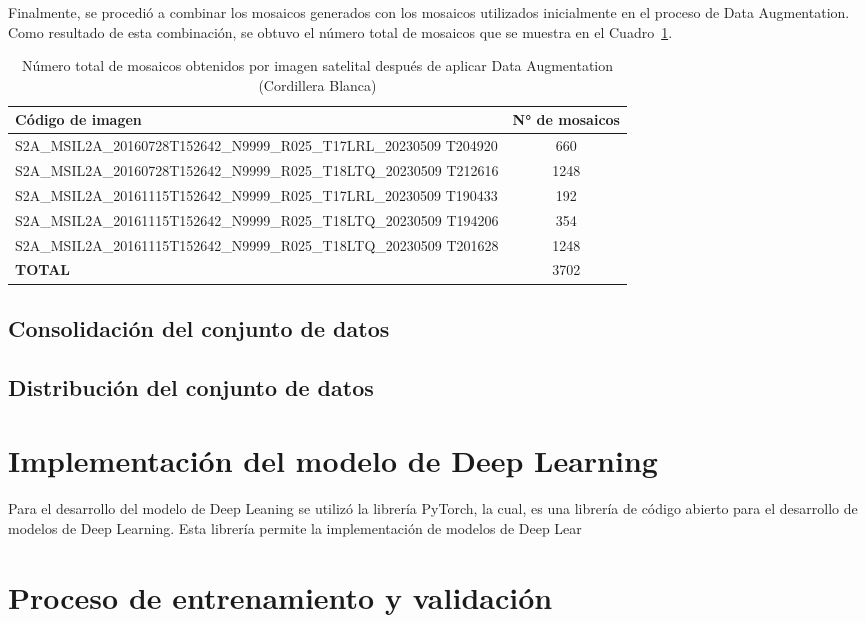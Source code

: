 \documentclass[12pt]{report}
\begin{document}
Finalmente, se procedió a combinar los mosaicos generados con los mosaicos utilizados inicialmente en el proceso de Data Augmentation. Como resultado de esta combinación, se obtuvo el número total de mosaicos que se muestra en el Cuadro~\ref{tab:MosaicosConAumentoDatosFinal}.

\begin{table}[H]
   \centering
   \caption{Número total de mosaicos obtenidos por imagen satelital después de aplicar Data Augmentation (Cordillera Blanca)}
   \begin{tabularx}{1\textwidth}{Xc} 
\hline
\textbf{Código de imagen} & \textbf{N° de mosaicos} \\
\hline
S2A\_MSIL2A\_20160728T152642\_N9999\_R025\_T17LRL\_20230509
T204920 & 660 \\
S2A\_MSIL2A\_20160728T152642\_N9999\_R025\_T18LTQ\_20230509
T212616 & 1248 \\
S2A\_MSIL2A\_20161115T152642\_N9999\_R025\_T17LRL\_20230509
T190433 & 192 \\
S2A\_MSIL2A\_20161115T152642\_N9999\_R025\_T18LTQ\_20230509
T194206 & 354 \\
S2A\_MSIL2A\_20161115T152642\_N9999\_R025\_T18LTQ\_20230509
T201628 & 1248 \\
\hline
\textbf{TOTAL} & 3702 \\
\hline
\end{tabularx}
\label{tab:MosaicosConAumentoDatosFinal}
\end{table}

\subsection{Consolidación del conjunto de datos}


\subsection{Distribución del conjunto de datos}


\section{Implementación del modelo de Deep Learning}

Para el desarrollo del modelo  de Deep Leaning se utilizó la librería PyTorch,
la cual, es una librería de código abierto para el desarrollo de modelos de Deep Learning.
Esta librería permite la implementación de modelos de Deep Lear 
\section{Proceso de entrenamiento y validación}
\end{document}
